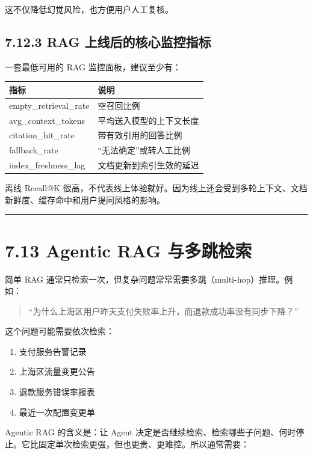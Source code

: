 这不仅降低幻觉风险，也方便用户人工复核。


\subsection{7.12.3 RAG 上线后的核心监控指标}

一套最低可用的 RAG 监控面板，建议至少有：


\begingroup
\scriptsize
\setlength{\tabcolsep}{3pt}
\begin{longtable}{|p{}|p{}|}
\hline
指标 & 说明 \\ \hline
empty\_retrieval\_rate & 空召回比例 \\ \hline
avg\_context\_tokens & 平均送入模型的上下文长度 \\ \hline
citation\_hit\_rate & 带有效引用的回答比例 \\ \hline
fallback\_rate & ``无法确定''或转人工比例 \\ \hline
index\_freshness\_lag & 文档更新到索引生效的延迟 \\ \hline
\end{longtable}
\endgroup

离线 Recall@K 很高，不代表线上体验就好。因为线上还会受到多轮上下文、文档新鲜度、缓存命中和用户提问风格的影响。


\bigskip\hrule\bigskip

\section{7.13 Agentic RAG 与多跳检索}

简单 RAG 通常只检索一次，但复杂问题常常需要多跳（multi-hop）推理。例如：


\begin{quote}
``为什么上海区用户昨天支付失败率上升，而退款成功率没有同步下降？''\\
\end{quote}

这个问题可能需要依次检索：


\begin{enumerate}[leftmargin=2em]
\item 支付服务告警记录
\item 上海区流量变更公告
\item 退款服务错误率报表
\item 最近一次配置变更单
\end{enumerate}

Agentic RAG 的含义是：让 Agent 决定是否继续检索、检索哪些子问题、何时停止。它比固定单次检索更强，但也更贵、更难控。所以通常需要：


